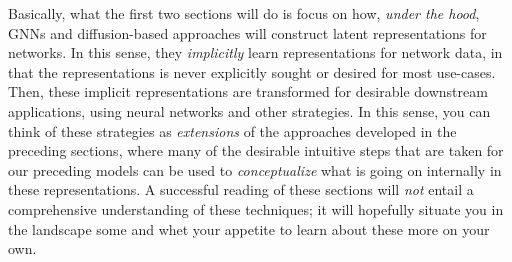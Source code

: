 Basically, what the first two sections will do is focus on how, \textit{under the hood}, GNNs and diffusion-based approaches will construct latent representations for networks. In this sense, they \textit{implicitly} learn representations for network data, in that the representations is never explicitly sought or desired for most use-cases. Then, these implicit representations are transformed for desirable downstream applications, using neural networks and other strategies. In this sense, you can think of these strategies as \textit{extensions} of the approaches developed in the preceding sections, where many of the desirable intuitive steps that are taken for our preceding models can be used to \textit{conceptualize} what is going on internally in these representations. A successful reading of these sections will \textit{not} entail a comprehensive understanding of these techniques; it will hopefully situate you in the landscape some and whet your appetite to learn about these more on your own.






